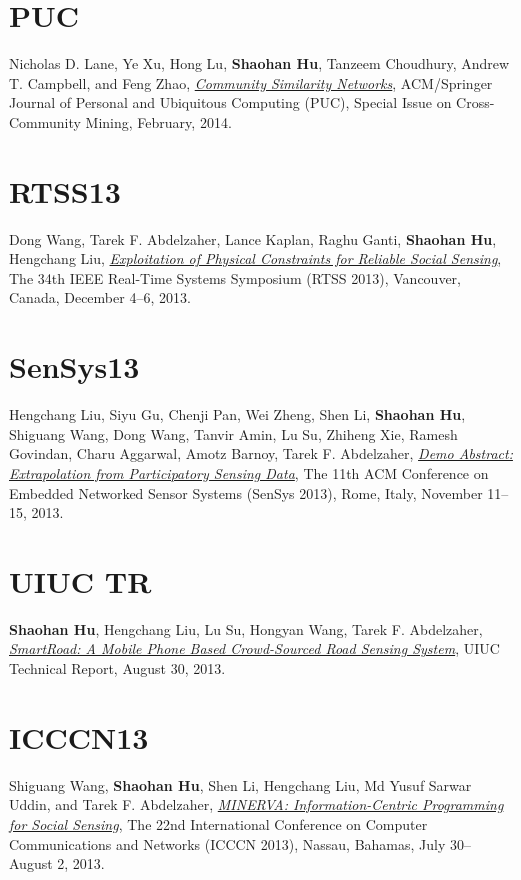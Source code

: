 \section{\sc PUC}\hypertarget{lane2013puc}{}
Nicholas D. Lane, Ye Xu, Hong Lu, \textbf{Shaohan Hu}, Tanzeem Choudhury, Andrew T. Campbell, and Feng Zhao, \href{http://link.springer.com/article/10.1007/s00779-013-0655-1}{\emph{Community Similarity Networks}}, \textsf{ACM/Springer Journal of Personal and Ubiquitous Computing (PUC), Special Issue on Cross-Community Mining}, February, 2014.

\section{\sc RTSS13}\hypertarget{wang2013rtss}{}
Dong Wang, Tarek F. Abdelzaher, Lance Kaplan, Raghu Ganti,
\textbf{Shaohan Hu}, Hengchang Liu, \href{http://ieeexplore.ieee.org/xpl/articleDetails.jsp?tp=&arnumber=6728876}{\emph{Exploitation of Physical
  Constraints for Reliable Social Sensing}}, \textsf{The 34th IEEE
  Real-Time Systems Symposium (RTSS 2013)}, Vancouver, Canada,
December 4--6, 2013.

\section{\sc SenSys13}\hypertarget{liu2013sensys}{}
Hengchang Liu, Siyu Gu, Chenji Pan, Wei Zheng, Shen Li,
\textbf{Shaohan Hu}, Shiguang Wang, Dong Wang, Tanvir Amin, Lu Su,
Zhiheng Xie, Ramesh Govindan, Charu Aggarwal, Amotz Barnoy, Tarek F.
Abdelzaher, \href{http://portal.acm.org/citation.cfm?id=2517431}{\emph{Demo Abstract: Extrapolation from Participatory
  Sensing Data}}, \textsf{The 11th ACM Conference on Embedded Networked
  Sensor Systems (SenSys 2013)}, Rome, Italy, November 11--15, 2013.

\section{\sc UIUC TR}\hypertarget{hu2013uiuc2}{}
\textbf{Shaohan Hu}, Hengchang Liu, Lu Su, Hongyan Wang, Tarek F.
Abdelzaher, \href{https://www.ideals.illinois.edu/handle/2142/45699}{\emph{SmartRoad: A Mobile Phone Based Crowd-Sourced Road
  Sensing System}}, \textsf{UIUC Technical Report}, August 30, 2013.

\section{\sc ICCCN13}\hypertarget{wang2013icccn}{}
Shiguang Wang, \textbf{Shaohan Hu}, Shen Li, Hengchang Liu, Md Yusuf
Sarwar Uddin, and Tarek F. Abdelzaher, \href{http://ieeexplore.ieee.org/xpls/abs_all.jsp?arnumber=6614152}{\emph{MINERVA: Information-Centric
  Programming for Social Sensing}}, \textsf{The 22nd International
  Conference on Computer Communications and Networks (ICCCN 2013)},
Nassau, Bahamas, July 30--August 2, 2013.

